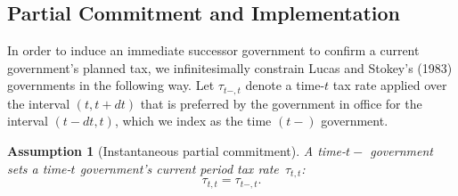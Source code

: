 \documentclass[12pt]{article}
\newtheorem{assumption}{Assumption}
\begin{document}
\subsection{Partial Commitment  and Implementation}
In order to  induce  an immediate successor government to  confirm a current government's planned  tax, 
we infinitesimally constrain  Lucas and Stokey's (1983)   governments in the following way. %
Let  $\tau_{t-,t}$ denote a time-$t$ tax rate applied over the interval $(t, t+dt)$ that is preferred by the government in office for the interval $(t-dt, t)$, which we index as the time $(t-)$ government. 
%
\begin{assumption}[Instantaneous partial commitment]\label{ass:timing}
	{A  time-$t-$} government sets a time-$t$ government's current period tax rate~$\tau_{t,t}$: %
	\begin{equation}\label{eq:timing}
	\tau_{t,t} = \tau_{t-,t}.
	\end{equation}
	
\end{assumption}
\end{document}
